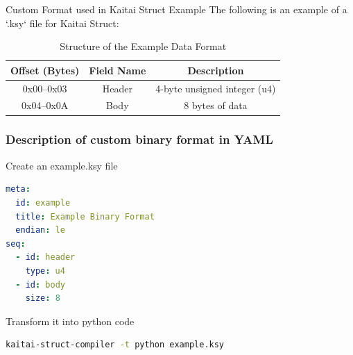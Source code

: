 \begin{frame}[fragile]{Custom Format used in Kaitai Struct Example}
The following is an example of a `.ksy` file for Kaitai Struct:

\begin{table}
\centering
\renewcommand{\arraystretch}{1.5} %
\begin{tabular}{|c|c|c|}
\hline
\textbf{Offset (Bytes)} & \textbf{Field Name} & \textbf{Description} \\ \hline
0x00--0x03             & \cellcolor{headercolor} Header              & 4-byte unsigned integer (u4) \\ \hline
0x04--0x0A             & \cellcolor{bodycolor} Body                & 8 bytes of data              \\ \hline
\end{tabular}
\caption{Structure of the Example Data Format}
\end{table}

\begin{table}
\caption{Visualization of the Example File}
\end{table}

\end{frame}

\begin{frame}[fragile]
\frametitle{Description of custom binary format in YAML}

Create an example.ksy file

\begin{lstlisting}[language=yaml]
meta:
  id: example
  title: Example Binary Format
  endian: le
seq:
  - id: header
    type: u4
  - id: body
    size: 8
\end{lstlisting}

Transform it into python code

\begin{lstlisting}[language=bash,frame=single]
kaitai-struct-compiler -t python example.ksy
\end{lstlisting}
\end{frame}

